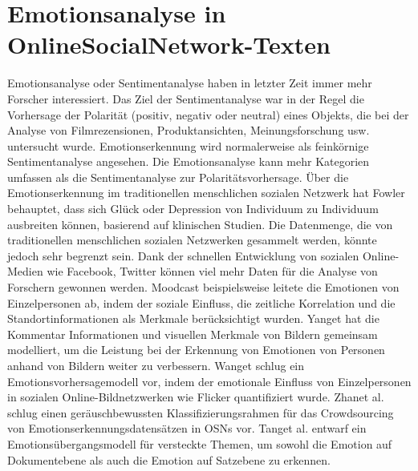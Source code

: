 \documentclass[conference]{IEEEtran}
\begin{document}
\section{Emotionsanalyse in OnlineSocialNetwork-Texten}
Emotionsanalyse oder Sentimentanalyse haben in letzter Zeit immer mehr Forscher interessiert.
Das Ziel der Sentimentanalyse war in der Regel die Vorhersage der Polarität (positiv, negativ oder neutral) eines Objekts, die bei der Analyse von Filmrezensionen, Produktansichten, Meinungsforschung usw. untersucht wurde. Emotionserkennung wird normalerweise als feinkörnige Sentimentanalyse angesehen. Die Emotionsanalyse kann mehr Kategorien umfassen als die
Sentimentanalyse zur Polaritätsvorhersage. Über die Emotionserkennung im traditionellen menschlichen sozialen Netzwerk hat Fowler behauptet, dass sich Glück oder Depression von Individuum zu Individuum ausbreiten können, basierend auf klinischen Studien. Die Datenmenge, die von traditionellen menschlichen sozialen Netzwerken gesammelt werden, könnte jedoch sehr begrenzt sein. Dank der schnellen Entwicklung von sozialen Online-Medien wie Facebook, Twitter können viel mehr Daten für die Analyse von Forschern gewonnen werden. Moodcast beispielsweise leitete die Emotionen von Einzelpersonen ab, indem der soziale Einfluss, die zeitliche Korrelation und die Standortinformationen als Merkmale berücksichtigt wurden. Yanget hat die
Kommentar Informationen und visuellen Merkmale von Bildern gemeinsam modelliert, um die Leistung bei der Erkennung von Emotionen von Personen anhand von Bildern weiter zu verbessern. Wanget schlug ein Emotionsvorhersagemodell vor, indem der emotionale Einfluss von Einzelpersonen in sozialen Online-Bildnetzwerken wie Flicker quantifiziert wurde. Zhanet al. schlug einen geräuschbewussten Klassifizierungsrahmen für das Crowdsourcing von Emotionserkennungsdatensätzen in OSNs vor. Tanget al. entwarf ein Emotionsübergangsmodell für versteckte Themen, um sowohl die Emotion auf Dokumentebene als auch die Emotion auf Satzebene zu erkennen.
\end{document}

